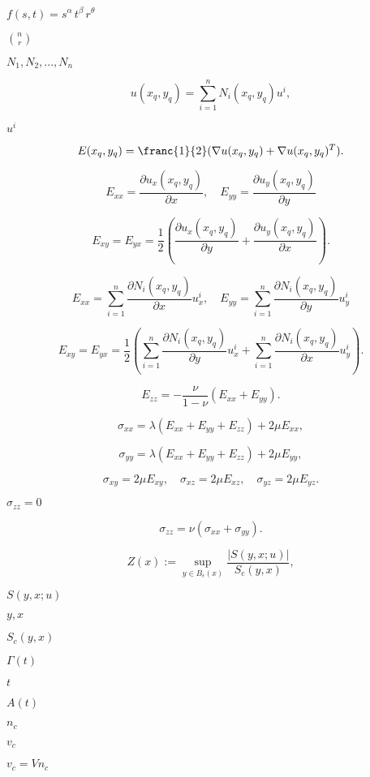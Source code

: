 \documentclass{article}
\begin{document}
$ f(s,t) = s^\alpha\, t^\beta \, r^\theta $
\pagebreak

$ {n\choose r}$
\pagebreak

$ N_1, N_2,..., N_n $
\pagebreak

\[ u(x_q,y_q) = \sum_{i=1}^n N_i(x_q, y_q) u^i, \]
\pagebreak

$ u^i $
\pagebreak

\[ E(x_q, y_q) = \franc{1}{2}( \nabla u(x_q, y_q) + \nabla u(x_q,y_q)^T ). \]
\pagebreak

\[ E_{xx} = \frac{\partial u_x(x_q, y_q)}{\partial x}, \quad E_{yy} = \frac{\partial u_y(x_q, y_q)}{\partial y} \]
\pagebreak

\[ E_{xy} = E_{yx} = \frac{1}{2}( \frac{\partial u_x(x_q, y_q) }{\partial y} + \frac{\partial u_y(x_q, y_q)}{\partial x}). \]
\pagebreak

\[ E_{xx} = \sum_{i=1}^n\frac{\partial N_i(x_q, y_q)}{\partial x} u^i_x, \quad E_{yy} = \sum_{i=1}^n \frac{\partial N_i(x_q, y_q)}{\partial y} u^i_y \]
\pagebreak

\[ E_{xy} = E_{yx} = \frac{1}{2}( \sum_{i=1}^n \frac{\partial N_i(x_q, y_q) }{\partial y} u^i_x + \sum_{i=1}^n \frac{\partial N_i(x_q, y_q) }{\partial x} u^i_y). \]
\pagebreak

\[ E_{zz} = -\frac{\nu}{1 - \nu} (E_{xx} + E_{yy}).\]
\pagebreak

\[ \sigma_{xx} = \lambda (E_{xx} + E_{yy} + E_{zz}) + 2\mu E_{xx},\]
\pagebreak

\[\sigma_{yy} = \lambda (E_{xx} + E_{yy} + E_{zz}) + 2\mu E_{yy},\]
\pagebreak

\[ \sigma_{xy} = 2\mu E_{xy},\quad \sigma_{xz} = 2\mu E_{xz}, \quad \sigma_{yz} = 2\mu E_{yz}.\]
\pagebreak

$ \sigma_{zz} = 0 $
\pagebreak

\[ \sigma_{zz} = \nu (\sigma_{xx} + \sigma_{yy}) .\]
\pagebreak

\[ Z(x) := \sup_{y\in B_\epsilon(x)} \frac{|S(y,x;u)|}{S_c(y,x)}, \]
\pagebreak

$ S(y, x;u) $
\pagebreak

$y,x$
\pagebreak

$S_c(y,x) $
\pagebreak

$ \Gamma(t) $
\pagebreak

$ t $
\pagebreak

$ A(t) $
\pagebreak

$ n_c$
\pagebreak

$ v_c $
\pagebreak

$ v_c = V n_c$
\pagebreak
\end{document}
